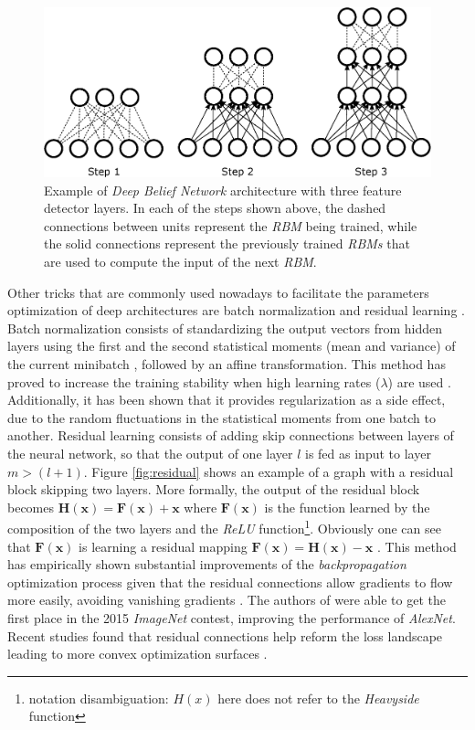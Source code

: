 \begin{figure}
	\centering
	\includegraphics[width=1\linewidth]{chapter2/images/dbn}
	\caption{Example of \textit{Deep Belief Network} architecture with three feature detector layers. In each of the steps shown above, the dashed connections between units represent the \textit{RBM} being trained, while the solid connections represent the previously trained \textit{RBMs} that are used to compute the input of the next \textit{RBM}.}
	\label{fig:dbn}
\end{figure}



Other tricks that are commonly used nowadays to facilitate the parameters optimization of deep architectures are batch normalization \autocite{ioffe2015} and residual learning \autocite{kaiming2016}. Batch normalization consists of standardizing the output vectors from hidden layers using the first and the second statistical moments (mean and variance) of the current minibatch \autocite{ioffe2015}, followed by an affine transformation. This method has proved to increase the training stability when high learning rates ($\lambda$) are used \autocite{Goodfellow2016}. Additionally, it has been shown that it provides regularization \autocite{dauphin2021} as a side effect, due to the random fluctuations in the statistical moments from one batch to another. Residual learning consists of adding skip connections between layers of the neural network, so that the output of one layer $l$ is fed as input to layer $m > (l+1)$. Figure \ref{fig:residual} shows an example of a graph with a residual block skipping two layers. More formally, the output of the residual block becomes $\mathbf{H(x)} = \mathbf{F(x)} + \mathbf{x}$ where $\mathbf{F(x)}$ is the function learned by the composition of the two layers and the \textit{ReLU} function\footnote{notation disambiguation: $H(x)$ here does not refer to the \textit{Heavyside} function}. Obviously one can see that $\mathbf{F(x)}$ is learning a residual mapping $\mathbf{F(x)} = \mathbf{H(x)} - \mathbf{x}$ \autocite{kaiming2016}. This method has empirically shown substantial improvements of the \textit{backpropagation} optimization process given that the residual connections allow gradients to flow more easily, avoiding vanishing gradients \autocite{Goodfellow2016}. The authors of \autocite{kaiming2016} were able to get the first place in the 2015 \textit{ImageNet} contest, improving the performance of \textit{AlexNet}. Recent studies found that residual connections help reform the loss landscape leading to more convex optimization surfaces \autocite{freeman2017, wang2020a}.


